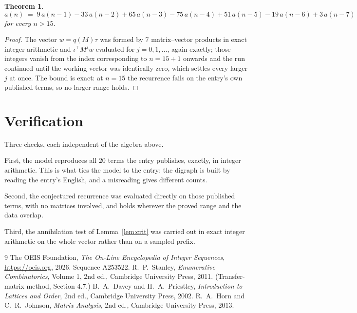 \documentclass[11pt,a4paper]{article}
\theoremstyle{plain}
\newtheorem{theorem}{Theorem}
\theoremstyle{definition}
\begin{document}
\begin{theorem}
\[
a(n)\;=\;9\,a(n-1) - 33\,a(n-2) + 65\,a(n-3) - 75\,a(n-4) + 51\,a(n-5) - 19\,a(n-6) + 3\,a(n-7)
\]
for every $n>15$.
\end{theorem}

\begin{proof}
The vector $w=q(M)\tau$ was formed by $7$ matrix--vector products in exact integer
arithmetic and $\iota^{\!\top}M^{j}w$ evaluated for $j=0,1,\dots$, again exactly; those
integers vanish from the index corresponding to $n=15+1$ onwards and the run continued
until the working vector was identically zero, which settles every larger $j$ at once. The bound is exact: at $n=15$ the recurrence fails on the entry's own published terms, so no larger range holds.
\end{proof}

\section{Verification}

Three checks, each independent of the algebra above.

First, the model reproduces all $20$ terms the entry publishes, exactly, in integer
arithmetic. This is what ties the model to the entry: the digraph is built by reading the
entry's English, and a misreading gives different counts.

Second, the conjectured recurrence was evaluated directly on those published terms, with no
matrices involved, and holds wherever the proved range and the data overlap.

Third, the annihilation test of Lemma~\ref{lem:crit} was carried out in exact integer
arithmetic on the whole vector rather than on a sampled prefix.

\begin{thebibliography}{9}
 The OEIS Foundation, \emph{The On-Line Encyclopedia of Integer
Sequences}, \url{https://oeis.org}, 2026. Sequence A253522.
 R.~P.~Stanley, \emph{Enumerative Combinatorics}, Volume 1, 2nd ed.,
Cambridge University Press, 2011. (Transfer-matrix method, Section 4.7.)
 B.~A.~Davey and H.~A.~Priestley, \emph{Introduction to Lattices and
Order}, 2nd ed., Cambridge University Press, 2002.
 R.~A.~Horn and C.~R.~Johnson, \emph{Matrix Analysis}, 2nd ed., Cambridge
University Press, 2013.
\end{thebibliography}
\end{document}
